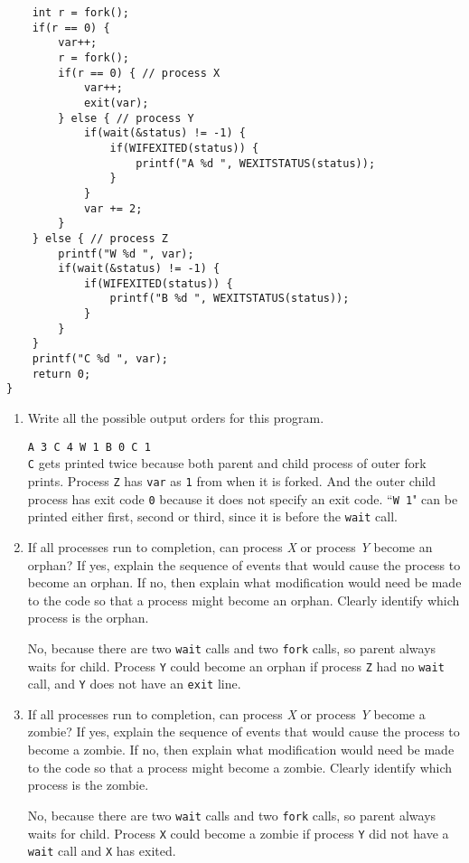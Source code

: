 \documentclass[11pt]{article}
\newcommand{\myspace}{\vspace{0.4cm}}
\begin{document}
\begin{enumerate}
\begin{Verbatim}
	int r = fork();
	if(r == 0) {
		var++;
		r = fork();
		if(r == 0) { // process X
			var++;
			exit(var);
		} else { // process Y
			if(wait(&status) != -1) {
				if(WIFEXITED(status)) {
					printf("A %d ", WEXITSTATUS(status));
				}
			}
			var += 2;
		}
	} else { // process Z
		printf("W %d ", var);
		if(wait(&status) != -1) {
			if(WIFEXITED(status)) {
				printf("B %d ", WEXITSTATUS(status));
			}
		}
	}
	printf("C %d ", var);
	return 0;
}
		\end{Verbatim}
		\begin{enumerate}
			\item Write all the possible output orders for this program.
				\begin{tcolorbox}\Verb|A 3 C 4 W 1 B 0 C 1|\\
					\Verb|C| gets printed twice because both parent and child process of outer fork prints. Process \Verb|Z| has \Verb|var| as \Verb|1| from when it is forked. And the outer child process has exit code \Verb|0| because it does not specify an exit code. ``\Verb|W 1|" can be printed either first, second or third, since it is before the \Verb|wait| call.
				\end{tcolorbox}
			\myspace
			\item If all processes run to completion, can process \textit{X} or process \textit{Y} become an orphan? If yes, explain the sequence of events that would cause the process to become an orphan. If no, then explain what modification would need be made to the code so that a process might become an orphan. Clearly identify which process is the orphan.
				\begin{tcolorbox}No, because there are two \Verb|wait| calls and two \Verb|fork| calls, so parent always waits for child. Process \Verb|Y| could become an orphan if process \Verb|Z| had no \Verb|wait| call, and \Verb|Y| does not have an \Verb|exit| line.\end{tcolorbox}

			\newpage
			\item
			If all processes run to completion, can process \textit{X} or process \textit{Y} become a zombie? If yes, explain the sequence of events that would cause the process to become a zombie. If no, then explain what modification would need be made to the code so that a process might become a zombie. Clearly identify which process is the zombie.
				\begin{tcolorbox}No, because there are two \Verb|wait| calls and two \Verb|fork| calls, so parent always waits for child. Process \Verb|X| could become a zombie if process \Verb|Y| did not have a \Verb|wait| call and \Verb|X| has exited.\end{tcolorbox}
		\end{enumerate}


\end{enumerate}
\end{document}
